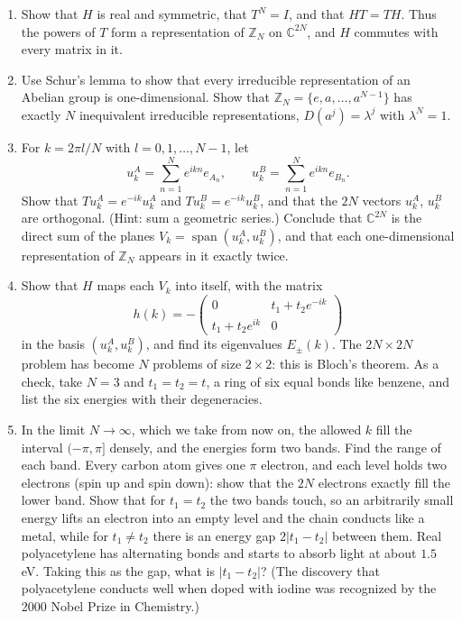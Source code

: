\documentclass[11pt,a4paper]{article}
\newcommand{\Z}{\mathbb{Z}}
\newcommand{\C}{\mathbb{C}}
\DeclareMathOperator{\spn}{span}
\begin{document}
\begin{enumerate}
  \item Show that $H$ is real and symmetric, that $T^N = I$, and that $HT = TH$. Thus the powers of $T$ form a representation of $\Z_N$ on $\C^{2N}$, and $H$ commutes with every matrix in it.
  \item Use Schur's lemma to show that every irreducible representation of an Abelian group is one-dimensional. Show that $\Z_N = \{e, a, \dots, a^{N-1}\}$ has exactly $N$ inequivalent irreducible representations, $D(a^j) = \lambda^j$ with $\lambda^N = 1$.
  \item For $k = 2\pi l/N$ with $l = 0, 1, \dots, N - 1$, let
  \[
    u^A_k = \sum_{n=1}^{N} e^{ikn} e_{A_n}, \qquad u^B_k = \sum_{n=1}^{N} e^{ikn} e_{B_n}.
  \]
  Show that $Tu^A_k = e^{-ik}u^A_k$ and $Tu^B_k = e^{-ik}u^B_k$, and that the $2N$ vectors $u^A_k$, $u^B_k$ are orthogonal. (Hint: sum a geometric series.) Conclude that $\C^{2N}$ is the direct sum of the planes $V_k = \spn(u^A_k, u^B_k)$, and that each one-dimensional representation of $\Z_N$ appears in it exactly twice.
  \item Show that $H$ maps each $V_k$ into itself, with the matrix
  \[
    h(k) = -\begin{pmatrix} 0 & t_1 + t_2e^{-ik} \\ t_1 + t_2e^{ik} & 0 \end{pmatrix}
  \]
  in the basis $(u^A_k, u^B_k)$, and find its eigenvalues $E_\pm(k)$. The $2N \times 2N$ problem has become $N$ problems of size $2 \times 2$: this is Bloch's theorem. As a check, take $N = 3$ and $t_1 = t_2 = t$, a ring of six equal bonds like benzene, and list the six energies with their degeneracies.
  \item In the limit $N \to \infty$, which we take from now on, the allowed $k$ fill the interval $(-\pi, \pi]$ densely, and the energies form two bands. Find the range of each band. Every carbon atom gives one $\pi$ electron, and each level holds two electrons (spin up and spin down): show that the $2N$ electrons exactly fill the lower band. Show that for $t_1 = t_2$ the two bands touch, so an arbitrarily small energy lifts an electron into an empty level and the chain conducts like a metal, while for $t_1 \ne t_2$ there is an energy gap $2|t_1 - t_2|$ between them. Real polyacetylene has alternating bonds and starts to absorb light at about $1.5$\,eV. Taking this as the gap, what is $|t_1 - t_2|$? (The discovery that polyacetylene conducts well when doped with iodine was recognized by the 2000 Nobel Prize in Chemistry.)
\end{enumerate}
\end{document}
